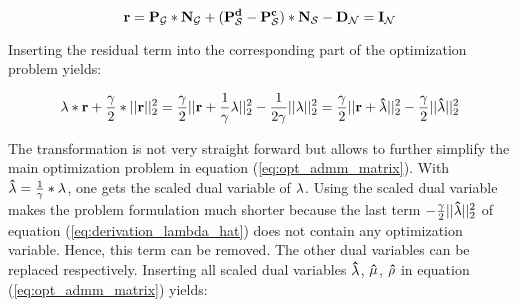 \begin{equation}
	\vb{r} = \vb{P_\mathcal{G}} * \vb{N_\mathcal{G}} + (\vb{P_\mathcal{S}^d} - \vb{P_\mathcal{S}^c}) * \vb{N_\mathcal{S}} - \vb{D_\mathcal{N}} = \vb{I_\mathcal{N}}
\end{equation}

%

Inserting the residual term into the corresponding part of the optimization problem yields:

\begin{equation}
	\vb{\lambda} * \vb{r} + \frac{\gamma}{2} * || \vb{r} ||^2_2 = \frac{\gamma}{2} || \vb{r} + \frac{1}{\gamma}\vb{\lambda} ||^2_2 - \frac{1}{2\gamma}|| \vb{\lambda} ||^2_2 = \frac{\gamma}{2} || \vb{r} + \vb{\hat{\lambda}} ||^2_2 - \frac{\gamma}{2}|| \vb{\hat{\lambda}} ||^2_2 \label{eq:derivation_lambda_hat}
\end{equation}

The transformation is not very straight forward but allows to further simplify the main optimization problem in equation (\ref{eq:opt_admm_matrix}). With $\vb{\hat{\lambda}} = \frac{1}{\gamma}*\vb{\lambda}$, one gets the scaled dual variable of $\vb{\lambda}$. Using the scaled dual variable makes the problem formulation much shorter because the last term $- \frac{\gamma}{2}|| \vb{\hat{\lambda}} ||^2_2$ of equation (\ref{eq:derivation_lambda_hat}) does not contain any optimization variable. Hence, this term can be removed. The other dual variables can be replaced respectively. Inserting all scaled dual variables $\vb{\hat{\lambda}}$, $\vb{\hat{\mu}}$, $\vb{\hat{\rho}}$ in equation (\ref{eq:opt_admm_matrix}) yields:

